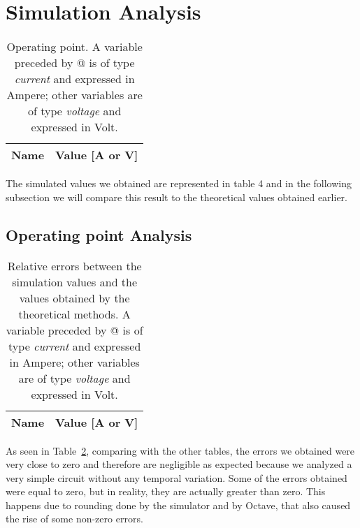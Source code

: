\section{Simulation Analysis}
\label{sec:simulation}

\begin{table}[!h]
 \centering
  \begin{tabular}{|l|r|}
    \hline    
    {\bf Name} & {\bf Value [A or V]} \\ \hline
    
  \end{tabular}
  \caption{Operating point. A variable preceded by @ is of type {\em current}
    and expressed in Ampere; other variables are of type {\it voltage} and expressed in
    Volt.}
  \label{tab:op}
\end{table}

The simulated values we obtained are represented in table 4 and in the following subsection we will compare this result to the theoretical values obtained earlier.

\subsection{Operating point Analysis}


\begin{table}[!h]
 \centering
  \begin{tabular}{|l|r|}
    \hline    
    {\bf Name} & {\bf Value [A or V]} \\ \hline
    
  \end{tabular}
  \caption{Relative errors between the simulation values and the values obtained by the theoretical methods.
   A variable preceded by @ is of type {\em current} and expressed in Ampere; other variables are of type {\it voltage}
    and expressed in Volt.}
  \label{tab:op1}
\end{table}

As seen in Table~\ref{tab:op1}, comparing with the other tables, the errors we obtained were very close to zero and therefore are negligible as expected because we analyzed a very simple circuit without any temporal variation.
Some of the errors obtained were equal to zero, but in reality, they are actually greater than zero. This happens due to rounding done by the simulator and by Octave, that also caused the rise of some non-zero errors.
